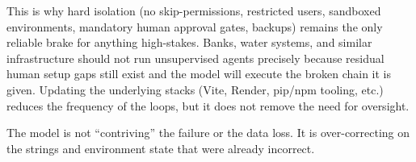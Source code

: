 This is why hard isolation (no skip-permissions, restricted users, sandboxed environments, mandatory human approval gates, backups) remains the only reliable brake for anything high-stakes. Banks, water systems, and similar infrastructure should not run unsupervised agents precisely because residual human setup gaps still exist and the model will execute the broken chain it is given. Updating the underlying stacks (Vite, Render, pip/npm tooling, etc.) reduces the frequency of the loops, but it does not remove the need for oversight.

The model is not “contriving” the failure or the data loss. It is over-correcting on the strings and environment state that were already incorrect.
